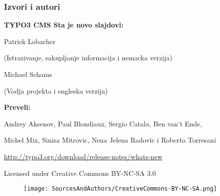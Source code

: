 \begin{frame}[fragile]
	\frametitle{Izvori i autori}

	\vspace{-0.6cm}

	\centerline{\textbf{TYPO3 CMS Sta je novo slajdovi:}}

	\begin{center}
		\smaller
			\centerline{Patrick Lobacher}
			\centerline{(Istrazivanje, sakupljanje informacija i nemacka verzija)}
			\vspace{0.1cm}
			\centerline{Michael Schams}
			\centerline{(Vodja projekta i engleska verzija)}
		\normalsize
	\end{center}
	\vspace{-0.6cm}
	\begin{center}
		\smaller
			\centerline{\textbf{Preveli:}}
			\centerline{Andrey Aksenov, Paul Blondiaux, Sergio Catala, Ben van't Ende,}
			\centerline{Michel Mix, Sinisa Mitrovic, Nena Jelena Radovic i Roberto Torresani}
		\normalsize
	\end{center}
	\vspace{-0.6cm}
	\smaller\begin{center}\url{http://typo3.org/download/release-notes/whats-new}\end{center}\normalsize

	\smaller\begin{center}Licensed under Creative Commons BY-NC-SA 3.0\end{center}\normalsize
	\begin{figure}\vspace*{-0.3cm}
		\texttt{[image: SourcesAndAuthors/CreativeCommons-BY-NC-SA.png]}
	\end{figure}

\end{frame}

